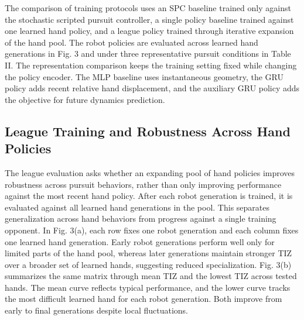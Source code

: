 \documentclass[letterpaper,journal]{IEEEtran}
\begin{document}
The comparison of training protocols uses an SPC baseline trained only against the stochastic scripted pursuit controller, a single policy baseline trained against one learned hand policy, and a league policy trained through iterative expansion of the hand pool. The robot policies are evaluated across learned hand generations in Fig. 3 and under three representative pursuit conditions in Table II. The representation comparison keeps the training setting fixed while changing the policy encoder. The MLP baseline uses instantaneous geometry, the GRU policy adds recent relative hand displacement, and the auxiliary GRU policy adds the objective for future dynamics prediction.

\subsection{League Training and Robustness Across Hand Policies}
The league evaluation asks whether an expanding pool of hand policies improves robustness across pursuit behaviors, rather than only improving performance against the most recent hand policy. After each robot generation is trained, it is evaluated against all learned hand generations in the pool. This separates generalization across hand behaviors from progress against a single training opponent. In Fig. 3(a), each row fixes one robot generation and each column fixes one learned hand generation. Early robot generations perform well only for limited parts of the hand pool, whereas later generations maintain stronger TIZ over a broader set of learned hands, suggesting reduced specialization. Fig. 3(b) summarizes the same matrix through mean TIZ and the lowest TIZ across tested hands. The mean curve reflects typical performance, and the lower curve tracks the most difficult learned hand for each robot generation. Both improve from early to final generations despite local fluctuations.
\end{document}
